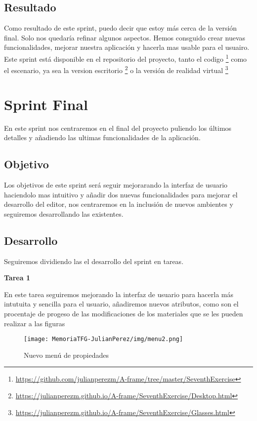 \documentclass[a4paper, 12pt]{book}
\begin{document}
\subsection{Resultado}

Como resultado de este sprint, puedo decir que estoy más cerca de la versión final. Solo nos quedaría refinar algunos aspectos. Hemos consguido crear nuevas funcionalidades, mejorar nuestra aplicación y hacerla mas usable para el usuairo. Este sprint está disponible en el repositorio del proyecto, tanto el codigo \footnote{\url{https://github.com/julianperezm/A-frame/tree/master/SeventhExercise}} como el escenario, ya sea la version escritorio \footnote{\url{https://julianperezm.github.io/A-frame/SeventhExercise/Desktop.html}} o la versión de realidad virtual \footnote{\url{https://julianperezm.github.io/A-frame/SeventhExercise/Glasses.html}}

\section{Sprint Final}
En este sprint nos centraremos en el final del proyecto puliendo los últimos detalles y añadiendo las ultimas funcionalidades de la aplicación.

\subsection{Objetivo}
Los objetivos de este sprint será seguir mejorarando la interfaz de usuario haciendolo mas intuitivo y añadir dos nuevas funcionalidades para mejorar el desarrollo del editor, nos centraremos en la inclusión de nuevos ambientes y seguiremos desarrollando las existentes.

\subsection{Desarrollo}
Seguiremos dividiendo las el desarrollo del sprint en tareas.

\textbf{Tarea 1}

En este tarea seguiremos mejorando la interfaz de usuario para hacerla más intutuita y sencilla para el usuario, añadiremos nuevos atributos, como son el procentaje de progeso de las modificaciones de los materiales que se les pueden realizar a las figuras 

\begin{figure}[H]
  \centering
  \texttt{[image: MemoriaTFG-JulianPerez/img/menu2.png]}
  \caption{Nuevo menú de propiedades}\label{menu2}
\end{figure}
\end{document}
